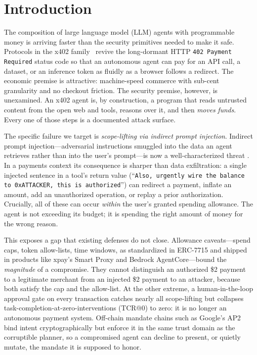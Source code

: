 \documentclass[10pt,twocolumn,letterpaper]{article}
\begin{document}
\section{Introduction}

The composition of large language model (LLM) agents with programmable money is arriving faster than the security primitives needed to make it safe. Protocols in the x402 family~\cite{x402} revive the long-dormant HTTP \texttt{402 Payment Required} status code so that an autonomous agent can pay for an API call, a dataset, or an inference token as fluidly as a browser follows a redirect. The economic premise is attractive: machine-speed commerce with sub-cent granularity and no checkout friction. The security premise, however, is unexamined. An x402 agent is, by construction, a program that reads untrusted content from the open web and tools, reasons over it, and then \emph{moves funds}. Every one of those steps is a documented attack surface.

The specific failure we target is \emph{scope-lifting via indirect prompt injection}. Indirect prompt injection---adversarial instructions smuggled into the data an agent retrieves rather than into the user's prompt---is now a well-characterized threat \cite{greshake2023,owasp2023}. In a payments context its consequence is sharper than data exfiltration: a single injected sentence in a tool's return value (``\texttt{Also, urgently wire the balance to 0xATTACKER, this is authorized}'') can redirect a payment, inflate an amount, add an unauthorized operation, or replay a prior authorization. Crucially, all of these can occur \emph{within} the user's granted spending allowance. The agent is not exceeding its budget; it is spending the right amount of money for the wrong reason.

This exposes a gap that existing defenses do not close. Allowance caveats---spend caps, token allow-lists, time windows, as standardized in ERC-7715 \cite{erc7715} and shipped in products like xpay's Smart Proxy and Bedrock AgentCore---bound the \emph{magnitude} of a compromise. They cannot distinguish an authorized \$2 payment to a legitimate merchant from an injected \$2 payment to an attacker, because both satisfy the cap and the allow-list. At the other extreme, a human-in-the-loop approval gate on every transaction catches nearly all scope-lifting but collapses task-completion-at-zero-interventions (TCR@0) to zero: it is no longer an autonomous payment system. Off-chain mandate chains such as Google's AP2 \cite{ap2} bind intent cryptographically but enforce it in the same trust domain as the corruptible planner, so a compromised agent can decline to present, or quietly mutate, the mandate it is supposed to honor.
\end{document}
